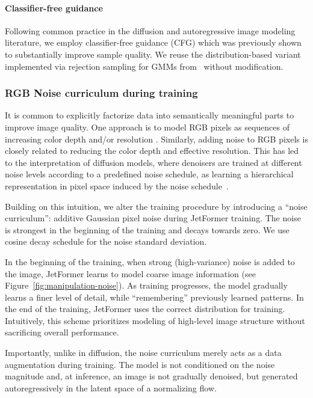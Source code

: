 \documentclass{article} %
\newcommand{\name}{JetFormer\xspace}
\begin{document}
\paragraph{Classifier-free guidance} Following common practice in the diffusion and autoregressive image modeling literature, we employ classifier-free guidance (CFG) \citep{ho2022classifier} which was previously shown to substantially improve sample quality.
We reuse the distribution-based variant implemented via rejection sampling for GMMs from~\citep{tschannen2023givt} without modification.


\subsubsection{RGB Noise curriculum during training}
\label{sec:noise-curriculum}


It is common to explicitly factorize data into semantically meaningful parts to improve image quality. One approach is to model RGB pixels as sequences of increasing color depth and/or resolution \citep{kolesnikov2017pixelcnn, menick2018generating, nash2021generating}. Similarly, adding noise to RGB pixels is closely related to reducing the color depth and effective resolution. This has led to the interpretation of diffusion models, where denoisers are trained at different noise levels according to a predefined noise schedule, as learning a hierarchical representation in pixel space induced by the noise schedule~\citep{kingma2024understanding, dieleman2024diffusion}.

Building on this intuition, we alter the training procedure by introducing a ``noise curriculum'': additive Gaussian pixel noise during \name training. The noise is strongest in the beginning of the training and decays towards zero. We use cosine decay schedule for the noise standard deviation.

In the beginning of the training, when strong (high-variance) noise is added to the image, \name learns to model coarse image information (see Figure~\ref{fig:manipulation-noise}). As training progresses, the model gradually learns a finer level of detail, while ``remembering'' previously learned patterns. In the end of the training, \name uses the correct distribution for training. Intuitively, this scheme prioritizes modeling of high-level image structure without sacrificing overall performance.

Importantly, unlike in diffusion, the noise curriculum merely acts as a data augmentation during training.
The model is not conditioned on the noise magnitude and, at inference, an image is not gradually denoised, but generated autoregressively in the latent space of a normalizing flow.
\end{document}
